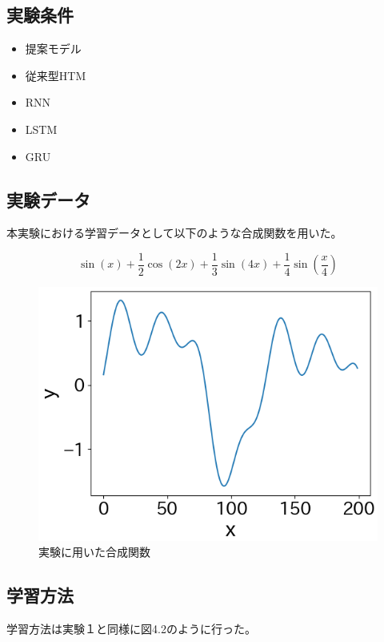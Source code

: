 \subsection{実験条件}

\begin{itemize}
  \item 提案モデル
  \item 従来型HTM
  \item RNN
  \item LSTM
  \item GRU \cite{GRU}
\end{itemize}

\subsection{実験データ}
本実験における学習データとして以下のような合成関数を用いた。

\begin{equation}
    \sin(x) + \frac{1}{2}\cos(2x) + \frac{1}{3}\sin(4x) + \frac{1}{4}\sin(\frac{x}{4})
\end{equation}

\begin{figure}[ht]
  \begin{center}
    \includegraphics[width=14cm]{./fig/cfunc}
    \caption{実験に用いた合成関数}
    \label{fig:cfunc}
  \end{center}
\end{figure}

\subsection{学習方法}
学習方法は実験１と同様に図4.2のように行った。

